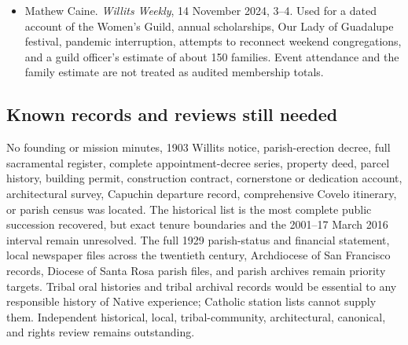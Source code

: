 \begin{itemize}[leftmargin=1.35em,itemsep=0.2em,topsep=0.2em]
\item Mathew Caine.  \emph{Willits Weekly}, 14 November 2024, 3--4. Used for a dated account of the Women's Guild, annual scholarships, Our Lady of Guadalupe festival, pandemic interruption, attempts to reconnect weekend congregations, and a guild officer's estimate of about 150 families. Event attendance and the family estimate are not treated as audited membership totals.
\end{itemize}

\subsection{Known records and reviews still needed}

No founding or mission minutes, 1903 Willits notice, parish-erection decree, full sacramental register, complete appointment-decree series, property deed, parcel history, building permit, construction contract, cornerstone or dedication account, architectural survey, Capuchin departure record, comprehensive Covelo itinerary, or parish census was located. The historical list is the most complete public succession recovered, but exact tenure boundaries and the 2001--17 March 2016 interval remain unresolved. The full 1929 parish-status and financial statement, local newspaper files across the twentieth century, Archdiocese of San Francisco records, Diocese of Santa Rosa parish files, and parish archives remain priority targets. Tribal oral histories and tribal archival records would be essential to any responsible history of Native experience; Catholic station lists cannot supply them. Independent historical, local, tribal-community, architectural, canonical, and rights review remains outstanding.

\endgroup
